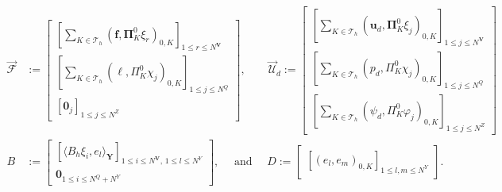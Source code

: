 \documentclass[smallextended]{svjour3}
\numberwithin{equation}{section}
\numberwithin{figure}{section}
\numberwithin{table}{section}
\newcommand\cero{{\boldsymbol{0}}}
\newcommand\bV{\mathbf{V}}
\newcommand\bPi{\boldsymbol{\Pi}}
\newcommand\ff{\boldsymbol{f}}
\newcommand\bu{\boldsymbol{u}}
\newcommand{\bY}{\boldsymbol{Y}}
\newcommand\cT{\mathcal{T}}
\begin{document}
\begin{align*}
        \vec{\mathcal{F}} &:=
			\begin{bmatrix} 
            [\sum_{K \in \cT_h} (\ff, \bPi^{0}_K \xi_r)_{0,K} ]_{1 \le r \le N^{\bV}} \\
			[ \sum_{K \in \cT_h}\left( \ell, \Pi^0_K \chi_j  \right)_{0,K}]_{1 \le j \le N^Q} \\ 
			[ \cero_j]_{1 \le j \le N^Z}
			\end{bmatrix},
            \qquad
        \vec{\mathcal{U}}_d :=
			\begin{bmatrix} 
            [ \sum_{K \in \cT_h}\left( \bu_d, \bPi^0_K \xi_j  \right)_{0,K}]_{1 \le j \le N^{\bV}} \\
			[ \sum_{K \in \cT_h}\left( p_d, \Pi^0_K \chi_j  \right)_{0,K}]_{1 \le j \le N^Q} \\ 
			[ \sum_{K \in \cT_h}\left( \psi_d, \Pi^0_K \varphi_j  \right)_{0,K}]_{1 \le j \le N^Z}
			\end{bmatrix} \\
        B &:= \begin{bmatrix}
				[ \langle B_h \xi_i, e_l \rangle_{\bY}]_{1 \le i \le N^{\bV}, \, 1 \le l \le N^Y} \\
                \cero_{1 \le i \le N^{Q} + N^Y}
			\end{bmatrix},  \quad
            \text{ and } \quad
        D := \begin{bmatrix}
				[ (e_l, e_m)_{0,K}]_{ 1 \le l,m \le N^Y}
			\end{bmatrix}.
	\end{align*}
\end{document}
